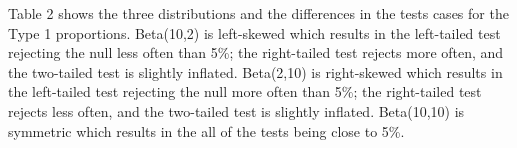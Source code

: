 \documentclass{article}\usepackage[]{graphicx}\usepackage[]{xcolor}
\begin{document}
\begin{enumerate}
\begin{enumerate}
Table 2 shows the three distributions and the differences in the tests cases for the Type 1 proportions. Beta(10,2) is left-skewed which results in the left-tailed test rejecting the null less often than 5\%; the right-tailed test rejects more often, and the two-tailed test is slightly inflated. Beta(2,10) is right-skewed which results in the left-tailed test rejecting the null more often than 5\%; the right-tailed test rejects less often, and the two-tailed test is slightly inflated. Beta(10,10) is symmetric which results in the all of the tests being close to 5\%. 
  \end{enumerate}
\end{enumerate}

\end{document}
